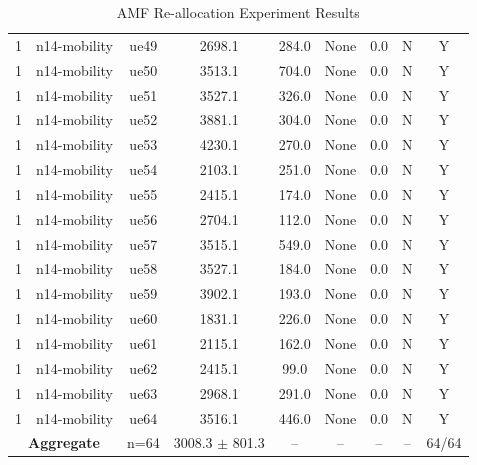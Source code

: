 \begin{table}[ht]
\begin{tabular}{|c|c|c|c|c|c|c|c|c|}
1 & n14-mobility & ue49 & 2698.1 & 284.0 & None & 0.0 & N & Y \\
1 & n14-mobility & ue50 & 3513.1 & 704.0 & None & 0.0 & N & Y \\
1 & n14-mobility & ue51 & 3527.1 & 326.0 & None & 0.0 & N & Y \\
1 & n14-mobility & ue52 & 3881.1 & 304.0 & None & 0.0 & N & Y \\
1 & n14-mobility & ue53 & 4230.1 & 270.0 & None & 0.0 & N & Y \\
1 & n14-mobility & ue54 & 2103.1 & 251.0 & None & 0.0 & N & Y \\
1 & n14-mobility & ue55 & 2415.1 & 174.0 & None & 0.0 & N & Y \\
1 & n14-mobility & ue56 & 2704.1 & 112.0 & None & 0.0 & N & Y \\
1 & n14-mobility & ue57 & 3515.1 & 549.0 & None & 0.0 & N & Y \\
1 & n14-mobility & ue58 & 3527.1 & 184.0 & None & 0.0 & N & Y \\
1 & n14-mobility & ue59 & 3902.1 & 193.0 & None & 0.0 & N & Y \\
1 & n14-mobility & ue60 & 1831.1 & 226.0 & None & 0.0 & N & Y \\
1 & n14-mobility & ue61 & 2115.1 & 162.0 & None & 0.0 & N & Y \\
1 & n14-mobility & ue62 & 2415.1 & 99.0 & None & 0.0 & N & Y \\
1 & n14-mobility & ue63 & 2968.1 & 291.0 & None & 0.0 & N & Y \\
1 & n14-mobility & ue64 & 3516.1 & 446.0 & None & 0.0 & N & Y \\
\multicolumn{2}{|c|}{\textbf{Aggregate}} & n=64 & 3008.3 $\pm$ 801.3 & -- & -- & -- & -- & 64/64 \\
\hline
\end{tabular}
\caption{AMF Re-allocation Experiment Results}
\label{tab:amf_realloc}
\end{table}
